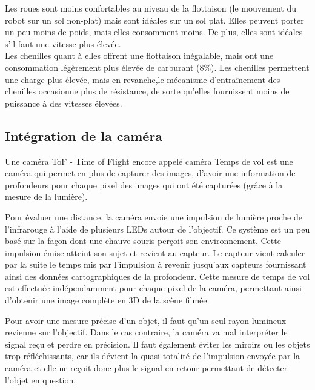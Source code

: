 

Les roues sont moins confortables au niveau de la flottaison (le mouvement du robot sur un sol non-plat) mais sont idéales sur un sol plat. Elles peuvent porter un peu moins de poids, mais elles consomment moins. De plus, elles sont idéales s’il faut une vitesse plus élevée.\\

Les chenilles quant à elles offrent une flottaison inégalable, mais ont une consommation légèrement plus élevée de carburant (8\%). Les chenilles permettent une charge plus élevée, mais en revanche,le mécanisme d’entraînement des chenilles occasionne plus de résistance, de sorte qu’elles fournissent moins de puissance à des vitesses élevées.

\subsection{Intégration de la caméra}
 
Une caméra ToF - Time of Flight encore appelé caméra Temps de vol est une caméra qui permet en plus de capturer des images, d'avoir une information de profondeurs pour chaque pixel des images qui ont été capturées (grâce à la mesure de la lumière).\\


Pour évaluer une distance, la caméra envoie une impulsion de lumière proche de l’infrarouge à l’aide de plusieurs LEDs autour de l’objectif. Ce système est un peu basé sur la façon dont une chauve souris perçoit son environnement. Cette impulsion émise atteint son sujet et revient au capteur. Le capteur vient calculer par la suite le temps mis par l’impulsion à revenir jusqu’aux capteurs fournissant ainsi des données cartographiques de la profondeur. Cette mesure de temps de vol est effectuée indépendamment pour chaque pixel de la caméra, permettant ainsi d’obtenir une image complète en 3D de la scène filmée.\\


Pour avoir une mesure précise d’un objet, il faut qu’un seul rayon lumineux revienne sur l’objectif. Dans le cas contraire, la caméra va mal interpréter le signal reçu et perdre en précision. 
Il faut également éviter les miroirs ou les objets trop réfléchissants, car ils dévient la quasi-totalité de l’impulsion envoyée par la caméra et elle ne reçoit donc plus le signal en retour permettant de détecter l’objet en question.\\


